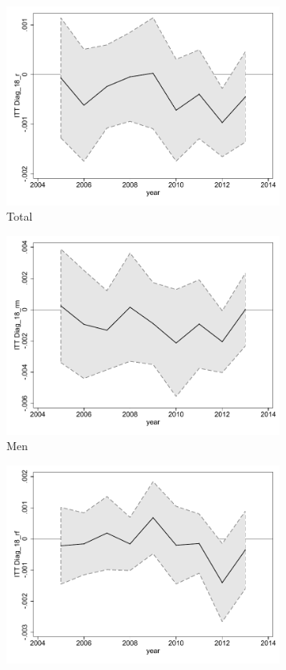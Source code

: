 \documentclass[a4paper ]{article}
\begin{document}
\begin{figure}[h!]
	\centering
	\begin{subfigure}[t]{0.31\textwidth}
		\centering
		\includegraphics[width=0.99\textwidth]{R1_LC_Diag_18_r}
		\caption{Total}		
	\end{subfigure}
	\begin{subfigure}[t]{0.31\textwidth}
		\centering
		\includegraphics[width=0.99\textwidth]{R1_LC_Diag_18_rm}
		\caption{Men}		
	\end{subfigure}
	\quad
	\begin{subfigure}[t]{0.31\textwidth}
		\centering
		\includegraphics[width=0.99\textwidth]{R1_LC_Diag_18_rf}

\end{subfigure}
\end{figure}
\end{document}
